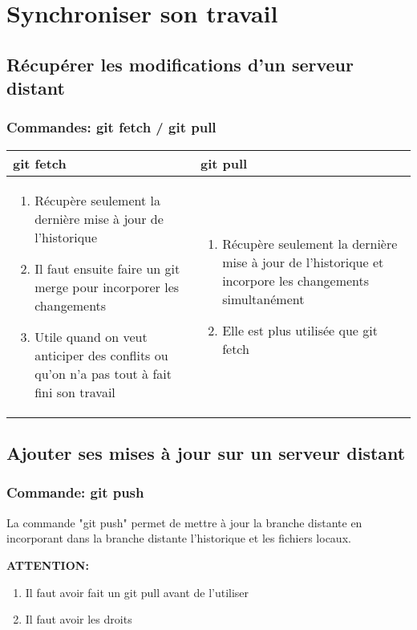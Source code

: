 \documentclass{beamer}
\begin{document}
\section{Synchroniser son travail}

\subsection{Récupérer les modifications d'un serveur distant}
\begin{frame}
\frametitle{Commandes: git fetch / git pull}

\begin{tabular}{ | m{13em} | m{13em} | }
    \hline
    
    \textbf{git fetch} & \textbf{git pull}\\
        
    \hline
    
    \begin{enumerate}
        \item Récupère seulement la dernière mise à jour de l'historique
        \item Il faut ensuite faire un git merge pour incorporer les changements
        \item Utile quand on veut anticiper des conflits ou qu'on n'a pas tout à fait fini son travail
    \end{enumerate}
    & 
    
    \begin{enumerate}
    \item Récupère seulement la dernière mise à jour de l'historique et incorpore les changements simultanément
    \item Elle est plus utilisée que git fetch
    \end{enumerate} \\
    
    \hline
\end{tabular}

\end{frame}


\subsection{Ajouter ses mises à jour sur un serveur distant}
\begin{frame}
\frametitle{Commande: git push}
La commande "git push" permet de mettre à jour la branche distante en incorporant dans la branche distante l'historique et les fichiers locaux.
\bigskip

\textbf{ATTENTION:} 
\begin{enumerate}
    \item Il faut avoir fait un git pull avant de l'utiliser
    \item Il faut avoir les droits
\end{enumerate}
\end{frame}
\end{document}
